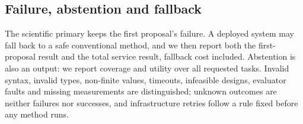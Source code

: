 \subsection{Failure, abstention and fallback}

The scientific primary keeps the first proposal's failure. A deployed system may fall back to a safe
conventional method, and we then report both the first-proposal result and the total service result,
fallback cost included. Abstention is also an output: we report coverage and utility over all
requested tasks. Invalid syntax, invalid types, non-finite values, timeouts, infeasible designs,
evaluator faults and missing measurements are distinguished; unknown outcomes are neither failures
nor successes, and infrastructure retries follow a rule fixed before any method runs.

